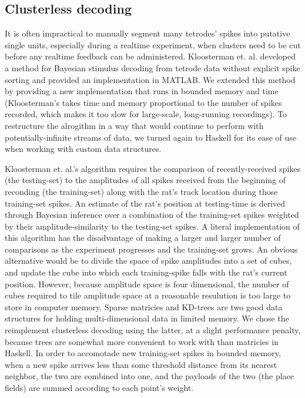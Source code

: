 \documentclass[10pt]{article}
\begin{document}
\subsection*{Clusterless decoding}

It is often impractical to manually segment many tetrodes' spikes into putative single units, especially during a realtime experiment, when clusters need to be cut before any realtime feedback can be administered. Kloosterman et. al. \cite{Kloosterman2013clusterless TODO} developed a method for Bayesian stimulus decoding from tetrode data without explicit spike sorting and provided an implementation in MATLAB. We extended this method by providing a new implementation that runs in bounded memory and time (Kloosterman's takes time and memory proportional to the number of spikes recorded, which makes it too slow for large-scale, long-running recordings). To restructure the alrogithm in a way that would continue to perform with potentially-infinite streams of data, we turned again to Haskell for its ease of use when working with custom data structures.

Kloosterman et. al.'s algorithm requires the comparison of recently-received spikes (the testing-set) to the amplitudes of all spikes received from the beginning of reconding (the training-set) along with the rat's track location during those training-set spikes. An estimate of the rat's position at testing-time is derived through Bayesian inference over a combination of the training-set spikes weighted by their amplitude-similarity to the testing-set spikes. A literal implementation of this algorithm has the disadvantage of making a larger and larger number of comparisons as the experiment progresses and the training-set grows. An obvious alternative would be to divide the space of spike amplitudes into a set of cubes, and update the cube into which each training-spike falls with the rat's current position. However, because amplitude space is four dimensional, the number of cubes required to tile amplitude space at a reasonable resulution is too large to store in computer memory. Sparse matricies and KD-trees are two good data structures for holding multi-dimensional data in limited memory. We chose the reimplement clusterless decoding using the latter, at a slight performance penalty, because trees are somewhat more convenient to work with than matricies in Haskell. In order to accomotade new training-set spikes in bounded memory, when a new spike arrives less than some threshold distance from its nearest neighbor, the two are combined into one, and the payloads of the two (the place fields) are summed according to each point's weight. 
\end{document}
